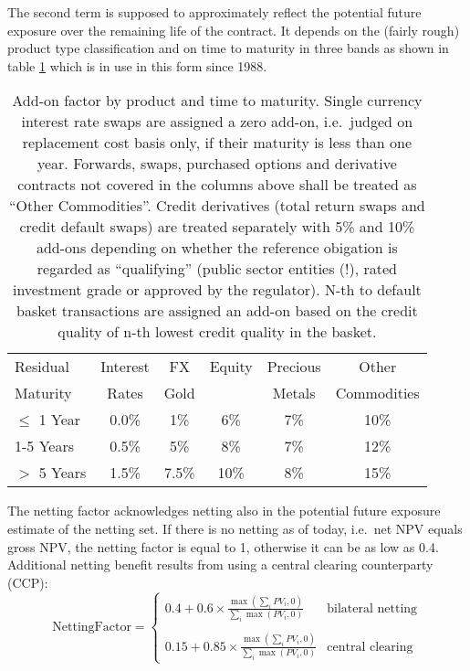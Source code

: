 The second term is supposed to approximately reflect the potential future exposure
over the remaining life of the contract. It depends on the (fairly rough) product type
classification and on time to maturity in three bands as shown in table
\ref{tab_addon} which is in use in this form since 1988.
\begin{table}[hbt]
\begin{center}
\begin{tabular}{|l || c | c | c | c | c |}
\hline
Residual & Interest & FX   & Equity & Precious & Other \\ 
Maturity &  Rates  & Gold &    & Metals   & Commodities\\
\hline
\hline
$\leq$ 1 Year & 0.0\% & 1\% & 6\% & 7\% & 10\% \\
1-5 Years     & 0.5\% & 5\% & 8\% & 7\%   & 12\% \\
$>$ 5 Years     & 1.5\% & 7.5\% & 10\% & 8\% & 15\% \\
\hline
\end{tabular}
\end{center}
\caption{Add-on factor by product and time to maturity. Single
  currency interest rate swaps are assigned a zero add-on, i.e.\ judged
  on replacement cost basis only, if their maturity is less than one year. Forwards,
  swaps, purchased options and derivative contracts not covered in
  the columns above shall be treated as ``Other Commodities''. Credit
  derivatives (total return swaps and credit default swaps) are
  treated separately with 5\% and 10\% add-ons depending on whether
  the reference obigation is regarded as ``qualifying'' (public sector
  entities (!), rated investment grade or approved by the regulator). 
N-th to default basket transactions are assigned an add-on 
based on the  credit quality of n-th lowest credit quality in the basket. }
\label{tab_addon}
\end{table}

The netting factor acknowledges netting also in the potential future
exposure estimate of the netting set. If there is no netting as of today, i.e.\  
net NPV equals gross NPV, the netting factor is equal to 1, otherwise
it can be as low as 0.4. Additional netting benefit results from
using a central clearing counterparty (CCP): 
$$
\text{NettingFactor} = \left\{\begin{array}{ll}
\displaystyle 0.4 + 0.6 \times \frac{\max\left(\sum_i PV_i, 0\right)}{\sum_i
  \max(PV_i,0)} & \text{bilateral netting}\\ \\
\displaystyle 0.15 + 0.85 \times \frac{\max\left(\sum_i PV_i, 0\right)}{\sum_i
  \max(PV_i,0)} & \text{central clearing}
\end{array}
\right.
$$

